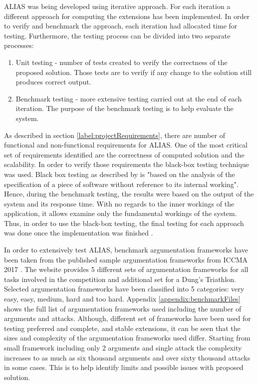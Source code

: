ALIAS was being developed using iterative approach. For each iteration a different approach for computing the extensions has been implemented. In order to verify and benchmark the approach, each iteration had allocated time for testing. Furthermore, the testing process can be divided into two separate processes: 
\begin{enumerate}
	\item Unit testing - number of tests created to verify the correctness of the proposed solution. Those tests are to verify if any change to the solution still produces correct output. 
	\item Benchmark testing - more extensive testing carried out at the end of each iteration. The purpose of the benchmark testing is to help evaluate the system. 
\end{enumerate}


As described in section \ref{label:projectRequirements}, there are number of functional and non-functional requirements for ALIAS. One of the most critical set of requirements identified are the correctness of computed solution and the scalability. In order to verify those requirements the black-box testing technique was used. Black box testing as described by \citet{testing2} is "based on the analysis of the specification of a piece of software without reference to its internal working". Hence, during the benchmark testing, the results were based on the output of the system and its response time. With no regards to the inner workings of the application, it allows examine only the fundamental workings of the system. Thus, in order to use the black-box testing, the final testing for each approach was done once the implementation was finished \citep{blackbox}.

In order to extensively test ALIAS, benchmark argumentation frameworks have been taken from the published sample argumentation frameworks from ICCMA 2017 \citep{iccmaResults}. The website provides 5 different sets of argumentation frameworks for all tasks involved in the competition and additional set for a Dung's Triathlon. Selected argumentation frameworks have been classified into 5 categories: very easy, easy, medium, hard and too hard. Appendix \ref{appendix:benchmarkFiles} shows the full list of argumentation frameworks used including the number of arguments and attacks. Although, different set of frameworks have been used for testing preferred and complete, and stable extensions, it can be seen that the sizes and complexity of the argumentation frameworks used differ. Starting from small framework including only 2 arguments and single attack the complexity increases to as much as six thousand arguments and over sixty thousand attacks in some cases. This is to help identify limits and possible issues with proposed solution. 


